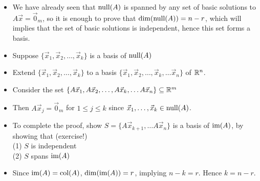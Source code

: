 \documentclass[pdf,9pt]{beamer}
\begin{document}
\begin{frame}[fragile]
\begin{proofnoend}[Outline]
    \begin{itemize}
      \item We have already seen that $\mbox{null}(A)$
          is spanned by any set of basic solutions to $A\vec{x}=\vec{0}_m$,
          so it is enough to prove that $\dim(\mbox{null}(A))=n-r$, which will implies that
	  the set of basic solutions is independent, hence this set forms a basis.
      \item Suppose $\{\vec{x}_1, \vec{x}_2, \ldots, \vec{x}_k\}$ is a basis of  $\mbox{null}(A)$
      \item Extend $\{\vec{x}_1, \vec{x}_2, \ldots, \vec{x}_k\}$ to a basis
          $\{\vec{x}_1, \vec{x}_2, \ldots, \vec{x}_k,\ldots \vec{x}_n\}$ of $\mathbb{R}^n$.
      \item Consider the set $\{A\vec{x}_1, A\vec{x}_2, \ldots, A\vec{x}_k,\ldots A\vec{x}_n\}\subseteq \mathbb{R}^m$
      \item Then
          $A\vec{x}_j = \vec{0}_m$ for $1\leq j\leq k$
          since $\vec{x}_1, \ldots, \vec{x}_k\in\mbox{null}(A)$.
      \item To complete the proof, show
          $S=\{ A\vec{x}_{k+1},\ldots A\vec{x}_n\}$ is a basis of $\mbox{im}(A)$,
	  by showing that (exercise!)\\
      (1)  $S$ is independent\\
      (2) $S$ spans $\mbox{im}(A)$
      \item Since $\mbox{im}(A)=\mbox{col}(A)$, $\dim(\mbox{im}(A))=r$, implying
          $n-k=r$. Hence $k=n-r$.  \myQED
    \end{itemize}
\end{proofnoend}

\end{frame}
\end{document}
